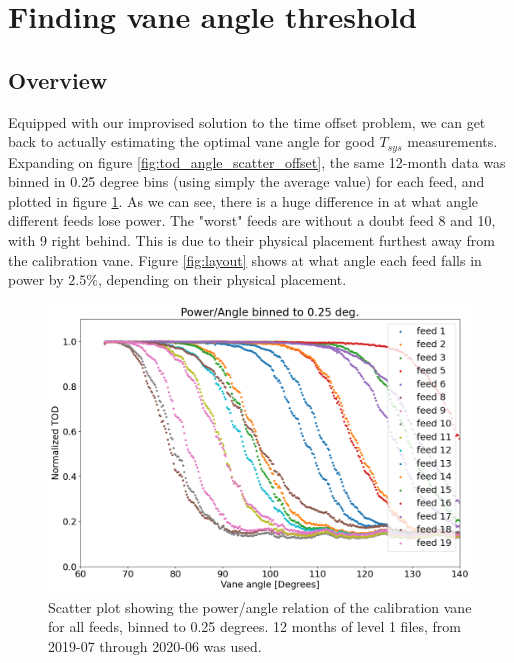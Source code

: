 \documentclass[10pt, a4paper]{article}
\begin{document}
\section{Finding vane angle threshold}
\subsection{Overview}
Equipped with our improvised solution to the time offset problem, we can get back to actually estimating the optimal vane angle for good $T_{sys}$ measurements. Expanding on figure \ref{fig:tod_angle_scatter_offset}, the same 12-month data was binned in 0.25 degree bins (using simply the average value) for each feed, and plotted in figure \ref{fig:binned_all}. As we can see, there is a huge difference in at what angle different feeds lose power. The "worst" feeds are without a doubt feed 8 and 10, with 9 right behind. This is due to their physical placement furthest away from the calibration vane. Figure \ref{fig:layout} shows at what angle each feed falls in power by $2.5\%$, depending on their physical placement. 

\vspace{1cm}
\begin{figure}[H]
    \centering
    \includegraphics[scale=0.4]{../plots/binned_all.png}
    \caption{Scatter plot showing the power/angle relation of the calibration vane for all feeds, binned to 0.25 degrees. 12 months of level 1 files, from 2019-07 through 2020-06 was used.}
    \label{fig:binned_all}
\end{figure}
\end{document}
